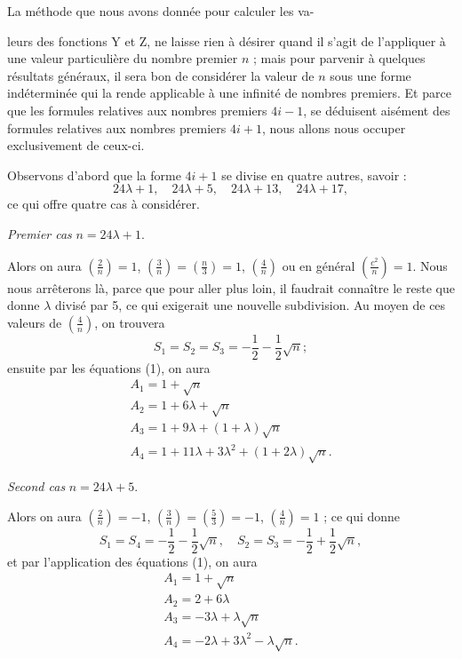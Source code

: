 \documentclass[11pt,a4paper]{article}
\begin{document}
La méthode que nous avons donnée pour calculer les va-


leurs des fonctions Y et Z, ne laisse rien à désirer quand il s'agit de
l'appliquer à une valeur particulière du nombre premier $n$ ; mais pour
parvenir à quelques résultats généraux, il sera bon de considérer la
valeur de $n$ sous une forme indéterminée qui la rende applicable à une
infinité de nombres premiers. Et parce que les formules relatives aux
nombres premiers $4i - 1$, se déduisent aisément des formules relatives
aux nombres premiers $4i + 1$, nous allons nous occuper exclusivement de
ceux-ci.

Observons d'abord que la forme $4i + 1$ se divise en quatre autres,
savoir :
\[
24\lambda + 1,\quad 24\lambda + 5,\quad 24\lambda + 13,\quad 24\lambda + 17,
\]
ce qui offre quatre cas à considérer.

\textit{Premier cas} $n = 24\lambda + 1$.

Alors on aura $\left(\frac{2}{n}\right) = 1$,
$\left(\frac{3}{n}\right) = \left(\frac{n}{3}\right) = 1$,
$\left(\frac{4}{n}\right)$ ou en général $\left(\frac{c^2}{n}\right) = 1$.
Nous nous arrêterons là, parce que pour aller plus loin, il faudrait
connaître le reste que donne $\lambda$ divisé par 5, ce qui exigerait une
nouvelle subdivision. Au moyen de ces valeurs de
$\left(\frac{4}{n}\right)$, on trouvera
\[
S_1 = S_2 = S_3 = -\frac{1}{2} - \frac{1}{2}\sqrt{n};
\]
ensuite par les équations (1), on aura
\[
\begin{array}{l}
A_1 = 1 + \sqrt{n} \\
A_2 = 1 + 6\lambda + \sqrt{n} \\
A_3 = 1 + 9\lambda + (1 + \lambda)\sqrt{n} \\
A_4 = 1 + 11\lambda + 3\lambda^2 + (1 + 2\lambda)\sqrt{n}.
\end{array}
\]


\textit{Second cas} $n = 24\lambda + 5$.

Alors on aura $\left(\frac{2}{n}\right) = -1$,
$\left(\frac{3}{n}\right) = \left(\frac{5}{3}\right) = -1$,
$\left(\frac{4}{n}\right) = 1$ ; ce qui donne
\[
S_1 = S_4 = -\frac{1}{2} - \frac{1}{2}\sqrt{n},\quad S_2 = S_3 = -\frac{1}{2} + \frac{1}{2}\sqrt{n},
\]
et par l'application des équations (1), on aura
\[
\begin{array}{l}
A_1 = 1 + \sqrt{n} \\
A_2 = 2 + 6\lambda \\
A_3 = -3\lambda + \lambda\sqrt{n} \\
A_4 = -2\lambda + 3\lambda^2 - \lambda\sqrt{n}.
\end{array}
\]
\end{document}

